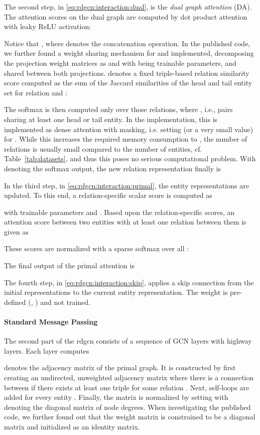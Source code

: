 \documentclass[runningheads]{llncs}
\begin{document}
The second step, in \eqref{eq:rdgcn:interaction:dual}, is the \emph{dual graph attention} (DA).
The attention scores on the dual graph  are computed by dot product attention with leaky ReLU activation:

Notice that , where  denotes the concatenation operation.
In the published code, we further found a weight sharing mechanism for  and  implemented,
decomposing the projection weight matrices as  and  with  being trainable parameters, and  shared between both projections.
 denotes a fixed triple-based relation similarity score computed as the sum of the Jaccard similarities of the head and tail entity set for relation  and :

The softmax is then computed only over those relations, where , i.e., pairs sharing at least one head or tail entity.
In the implementation, this is implemented as dense attention with masking, i.e. setting  (or a very small value) for .
While this increases the required memory consumption to , the number of relations is usually small compared to the number of entities, cf. Table~\ref{tab:datasets}, and thus this poses no serious computational problem.
With  denoting the softmax output, the new relation representation finally is


In the third step, in \eqref{eq:rdgcn:interaction:primal}, the entity representations are updated.
To this end, a relation-specific scalar score is computed as

with trainable parameters  and . 
Based upon the relation-specific scores, an attention score between two entities  with at least one relation between them is given as

These scores are normalized with a sparse softmax over all :

The final output of the primal attention is


The fourth step, in \eqref{eq:rdgcn:interaction:skip}, applies a skip connection from the initial representations to the current entity representation.
The weight  is pre-defined (, ) and not trained.


\paragraph{Standard Message Passing}
The second part of the \acrshort{rdgcn} consists of a sequence of GCN layers with highway layers.
Each layer computes

 denotes the adjacency matrix of the primal graph.
It is constructed by first creating an undirected, unweighted adjacency matrix where there is a connection between  if there exists at least one triple  for some relation .
Next, self-loops  are added for every entity .
Finally, the matrix is normalized by setting  with  denoting the diagonal matrix of node degrees.
When investigating the published code, we further found out that the weight matrix  is constrained to be a diagonal matrix and initialized as an identity matrix.
\end{document}
